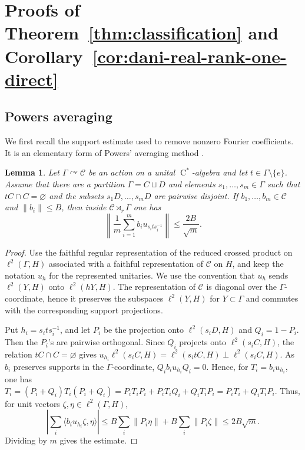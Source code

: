 \documentclass[11pt]{amsart}
\numberwithin{equation}{section}
\newcommand{\rC}{\operatorname{C}}
\newtheorem{lemma}[theorem]{Lemma}
\theoremstyle{definition}
\begin{document}
	
	\section{Proofs of Theorem~\ref{thm:classification} and Corollary~\ref{cor:dani-real-rank-one-direct}}\label{sec:proof}
	
	\subsection{Powers averaging}
	
	We first recall the support estimate used to remove nonzero Fourier coefficients. It is an elementary form of Powers' averaging method \cite{Po75}.
	
	\begin{lemma}\label{lem:powers-criterion}
		Let \(\Gamma\curvearrowright\mathcal C\) be an action on a unital
		\(\rC^*\)-algebra and let \(t\in\Gamma\setminus\{e\}\). Assume that there are
		a partition \(\Gamma=C\sqcup D\) and elements
		\(s_1,\ldots,s_m\in\Gamma\) such that \(tC\cap C=\varnothing\) and the subsets
		\(s_1D,\ldots,s_mD\) are pairwise disjoint. If
		\(b_1,\ldots,b_m\in\mathcal C\) and \(\|b_i\|\leq B\), then inside
		\(\mathcal C\rtimes_r\Gamma\) one has
		\[
		\left\|\frac1m\sum_{i=1}^m b_i u_{s_i t s_i^{-1}}\right\|
		\leq \frac{2B}{\sqrt m}.
		\]
	\end{lemma}
	
	\begin{proof}
		Use the faithful regular representation of the reduced crossed product on \(\ell^2(\Gamma,H)\) associated with a faithful representation of \(\mathcal C\) on \(H\), and keep the notation \(u_h\) for the represented unitaries. We use the convention that \(u_h\) sends \(\ell^2(Y,H)\) onto \(\ell^2(hY,H)\). The representation of \(\mathcal C\) is diagonal over the \(\Gamma\)-coordinate, hence it preserves the subspaces \(\ell^2(Y,H)\) for \(Y\subset\Gamma\) and commutes with the corresponding support projections.
		
		Put \(h_i=s_i t s_i^{-1}\), and let \(P_i\) be the projection onto \(\ell^2(s_iD,H)\) and \(Q_i=1-P_i\). Then the \(P_i\)'s are pairwise orthogonal. Since \(Q_i\) projects onto \(\ell^2(s_iC,H)\), the relation \(tC\cap C=\varnothing\) gives \(u_{h_i}\ell^2(s_iC,H)=\ell^2(s_itC,H)\perp\ell^2(s_iC,H)\). As \(b_i\) preserves supports in the \(\Gamma\)-coordinate, \(Q_i b_i u_{h_i}Q_i=0\). Hence, for \(T_i=b_i u_{h_i}\), one has \(T_i=(P_i+Q_i)T_i(P_i+Q_i)=P_iT_iP_i+P_iT_iQ_i+Q_iT_iP_i=P_iT_i+Q_iT_iP_i\). Thus, for unit vectors \(\zeta,\eta\in\ell^2(\Gamma,H)\),
		\[
		\left|\sum_i\langle b_i u_{h_i}\zeta,\eta\rangle\right|
		\leq
		B\sum_i\|P_i\eta\|+B\sum_i\|P_i\zeta\|
		\leq 2B\sqrt m.
		\]
		Dividing by \(m\) gives the estimate.
	\end{proof}
	
\end{document}
